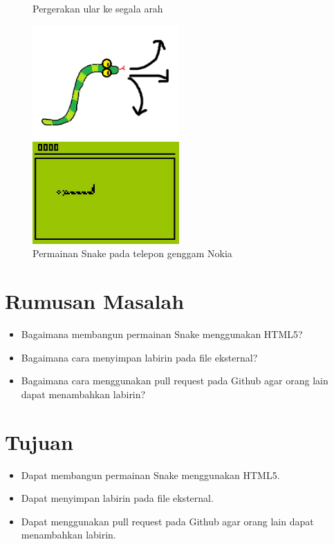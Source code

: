 \documentclass[a4paper,twoside]{article}
\begin{document}
\begin{figure}[H]
	\centering
	\begin{minipage}{.5\textwidth}
		\caption{Pergerakan ular ke segala arah}
		\centering
		\includegraphics[width=0.5\textwidth]{snake.png}
	\end{minipage}%
	\begin{minipage}{.5\textwidth}
		\caption{Permainan Snake pada telepon genggam Nokia}
		\centering
		\includegraphics[width=0.5\textwidth]{snake2.jpg}
	\end{minipage}
\end{figure}

\section{Rumusan Masalah}
\begin{itemize}
	\item Bagaimana membangun permainan Snake menggunakan HTML5? 
	\item Bagaimana cara menyimpan labirin pada file eksternal?
	\item Bagaimana cara menggunakan pull request pada Github agar orang lain dapat menambahkan labirin?
\end{itemize}

\section{Tujuan}
\begin{itemize}
	\item Dapat membangun permainan Snake menggunakan HTML5. 
	\item Dapat menyimpan labirin pada file eksternal.
	\item Dapat menggunakan pull request pada Github agar orang lain dapat menambahkan labirin.
\end{itemize}
\end{document}
